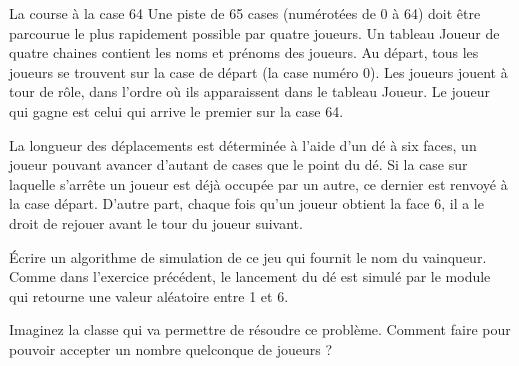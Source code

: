 \begin{Exercice}{La course à la case 64}
	Une piste de 65 cases (numérotées de 0 à 64)
	doit être parcourue le plus rapidement possible par quatre joueurs. Un
	tableau Joueur de quatre chaines contient les noms et prénoms des
	joueurs. Au départ, tous les joueurs se trouvent sur la case de départ
	(la case numéro 0). Les joueurs jouent à tour de rôle, dans l’ordre où
	ils apparaissent dans le tableau Joueur. Le joueur qui gagne est celui
	qui arrive le premier sur la case 64.

	La longueur des déplacements est déterminée à
	l’aide d’un dé à six faces, un joueur pouvant avancer d’autant de cases
	que le point du dé. Si la case sur laquelle s’arrête un joueur est déjà
	occupée par un autre, ce dernier est renvoyé à la case départ. D’autre
	part, chaque fois qu’un joueur obtient la face 6, il a le droit de
	rejouer avant le tour du joueur suivant. 

	Écrire un algorithme de simulation de ce jeu
	qui fournit le nom du vainqueur. Comme dans l’exercice précédent, le
	lancement du dé est simulé par le module  qui retourne une valeur aléatoire entre 1 et 6.

	Imaginez la classe  qui va permettre
	de résoudre ce problème. Comment faire pour pouvoir accepter un nombre
	quelconque de joueurs ?
\end{Exercice}

